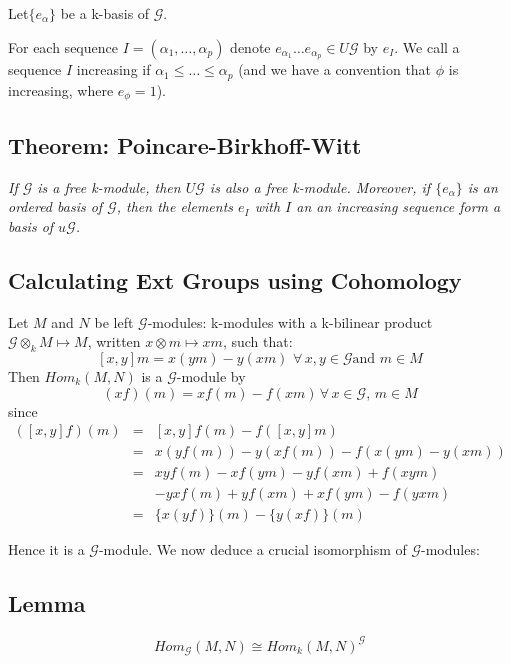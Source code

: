 Let$\{ e_\alpha \}$ be a k-basis of $\mathcal G$.

For each sequence $I=(\alpha_1, \dots , \alpha_p )$ denote
$e_{\alpha_1}\dots e_{\alpha_p} \in U\mathcal G$ by $e_I$. We call
a sequence $I$ increasing if $\alpha_1\leq \dots \leq \alpha_p$
(and we have a convention that $\phi$ is increasing, where $e_\phi
= 1$).

\subsection*{Theorem: Poincare-Birkhoff-Witt}

\emph{If $\mathcal G$ is a free k-module, then $U\mathcal G$ is
also a free k-module. Moreover, if $\{ e_\alpha \}$ is an ordered
basis of $\mathcal G$, then the elements $e_I$ with $I$ an an
increasing sequence form a basis of $u\mathcal G$.}

\subsection{Calculating Ext Groups using Cohomology}\label{df4.4}
Let $M$ and $N$ be left $\mathcal G$-modules: k-modules with a
k-bilinear product \\ $\mathcal G \otimes_k M\mapsto M$, written
$x\otimes m\mapsto xm$, such that:
$$[x,y]m = x(ym)-y(xm) \,\,\forall\, x,y \in \mathcal G \text{
and }m\in M$$ Then $Hom_k(M,N)$ is a $\mathcal G$-module by
$$(xf)(m) = xf(m)-f(xm)\,\forall\,x\in\mathcal G,\, m\in M$$
since
\begin{eqnarray}
\nonumber ([x,y]f)(m) &=& [x,y]f(m) - f([x,y]m)\\
\nonumber             &=& x(yf(m))-y(xf(m))-f(x(ym)-y(xm))\\
\nonumber             &=& xyf(m)-xf(ym)-yf(xm)+f(xym)\\
\nonumber             & & -yxf(m) +yf(xm)+xf(ym)-f(yxm)\\
\nonumber             &=& \{x(yf)\}(m)-\{y(xf)\}(m)
\end{eqnarray}

Hence it is a $\mathcal G$-module. We now deduce a crucial
isomorphism of $\mathcal G$-modules:

\subsection{Lemma}\label{df4.4.1}
\emph{$$Hom_\mathcal G (M,N) \cong {Hom_k(M,N)}^\mathcal G$$}

